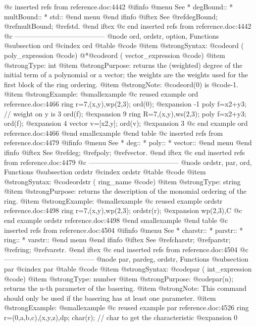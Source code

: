 {@c inserted refs from reference.doc:4442
@ifinfo
@menu
See
* degBound::
* multBound::
* std::
@end menu
@end ifinfo
@iftex
See
@ref{degBound};
@ref{multBound};
@ref{std}.
@end iftex
@c end inserted refs from reference.doc:4442
@c ---------------------------------------
@node ord, ordstr, option, Functions
@subsection ord
@cindex ord
@table @code
@item @strong{Syntax:}
@code{ord (} poly_expression @code{)}
@*@code{ord (} vector_expression @code{)}
@item @strong{Type:}
int
@item @strong{Purpose:}
returns the (weighted) degree of
the initial term of a polynomial or a vector;
the weights are the weights used for the first block of the ring ordering.
@item @strong{Note:}
@code{ord(0)} is @code{-1}.
@item @strong{Example:}
@smallexample
@c reused example ord reference.doc:4466 
  ring r=7,(x,y),wp(2,3);
  ord(0);
@expansion{} -1
  poly f=x2+y3;  // weight on y is 3
  ord(f);
@expansion{} 9
  ring R=7,(x,y),ws(2,3);
  poly f=x2+y3;
  ord(f);
@expansion{} 4
  vector v=[x2,y];
  ord(v);
@expansion{} 3
@c end example ord reference.doc:4466
@end smallexample
@end table
@c inserted refs from reference.doc:4479
@ifinfo
@menu
See
* deg::
* poly::
* vector::
@end menu
@end ifinfo
@iftex
See
@ref{deg};
@ref{poly};
@ref{vector}.
@end iftex
@c end inserted refs from reference.doc:4479
@c ---------------------------------------
@node ordstr, par, ord, Functions
@subsection ordstr
@cindex ordstr
@table @code
@item @strong{Syntax:}
@code{ordstr (} ring_name @code{)}
@item @strong{Type:}
string
@item @strong{Purpose:}
returns the description of the monomial ordering of the ring.
@item @strong{Example:}
@smallexample
@c reused example ordstr reference.doc:4498 
  ring r=7,(x,y),wp(2,3);
  ordstr(r);
@expansion{} wp(2,3),C
@c end example ordstr reference.doc:4498
@end smallexample
@end table
@c inserted refs from reference.doc:4504
@ifinfo
@menu
See
* charstr::
* parstr::
* ring::
* varstr::
@end menu
@end ifinfo
@iftex
See
@ref{charstr};
@ref{parstr};
@ref{ring};
@ref{varstr}.
@end iftex
@c end inserted refs from reference.doc:4504
@c ---------------------------------------
@node par, pardeg, ordstr, Functions
@subsection par
@cindex par
@table @code
@item @strong{Syntax:}
@code{par (} int_expression @code{)}
@item @strong{Type:}
number
@item @strong{Purpose:}
@code{par(n);} returns the n-th parameter of the basering.
@item @strong{Note:}
This command should only be used if the basering has at least one parameter.
@item @strong{Example:}
@smallexample
@c reused example par reference.doc:4526 
  ring r=(0,a,b,c),(x,y,z),dp;
  char(r);  // char to get the characteristic
@expansion{} 0
}
